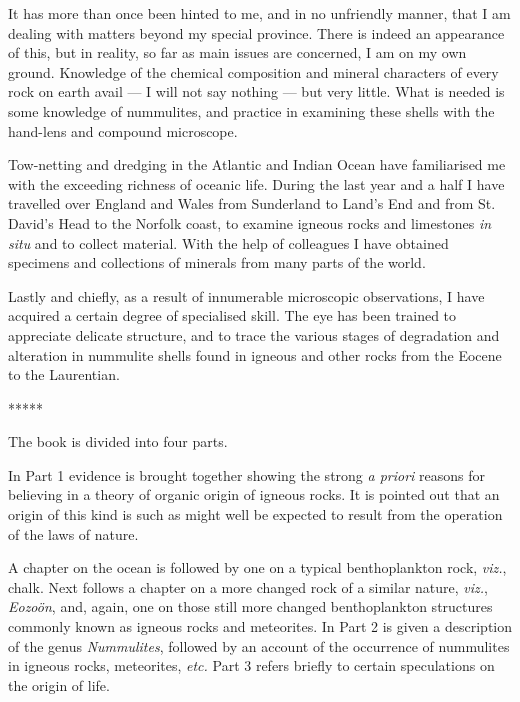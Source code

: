 \documentclass[a4paper, 12pt, oneside]{article}
\begin{document}
\begin{enumerate}
\hspace*{5mm}It has more than once been hinted to me, and in no unfriendly manner, that I am dealing with matters beyond my special province. There is indeed an appearance of this, but in reality, so far as main issues are concerned, I am on my own ground. Knowledge of the chemical composition and mineral characters of every rock on earth avail --- I will not say nothing --- but very little. What is needed is some knowledge of nummulites, and practice in examining these shells with the hand-lens and compound microscope.

\hspace*{5mm}Tow-netting and dredging in the Atlantic and Indian Ocean have familiarised me with the exceeding richness of oceanic life. During the last year and a half I have travelled over England and Wales from Sunderland to Land's End and from St. David's Head to the Norfolk coast, to examine igneous rocks and limestones \emph{in situ} and to collect material. With the help of colleagues I have obtained specimens and collections of minerals from many parts of the world.

\hspace*{5mm}Lastly and chiefly, as a result of innumerable microscopic observations, I have acquired a certain degree of specialised skill. The eye has been trained to appreciate delicate structure, and to trace the various stages of degradation and alteration in nummulite shells found in igneous and other rocks from the Eocene to the Laurentian.
\end{enumerate}

\centerline{*\hspace{15mm}*\hspace{15mm}*\hspace{15mm}*\hspace{15mm}*}
\bigskip

The book is divided into four parts.

In Part 1 evidence is brought together showing the strong \emph{a priori} reasons for believing in a theory of organic origin of igneous rocks. It is pointed out that an origin of this kind is such as might well be expected to result from the operation of the laws of nature.

A chapter on the ocean is followed by one on a typical benthoplankton rock, \emph{viz.}, chalk. Next follows a chapter on a more changed rock of a similar nature, \emph{viz.}, \emph{Eozoön}, and, again, one on those still more changed benthoplankton structures commonly known as igneous rocks and meteorites. In Part 2 is given a description of the genus \emph{Nummulites}, followed by an account of the occurrence of nummulites in igneous rocks, meteorites, \emph{etc.} Part 3 refers briefly to certain speculations on the origin of life.
\end{document}
